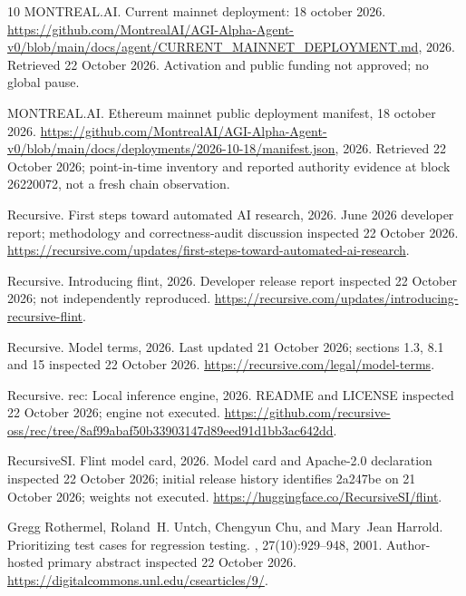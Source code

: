 \documentclass[11pt,letterpaper]{article}
\begin{document}
\begin{thebibliography}{10}
{MONTREAL.AI}.
\newblock Current mainnet deployment: 18 october 2026.
\newblock
  \url{https://github.com/MontrealAI/AGI-Alpha-Agent-v0/blob/main/docs/agent/CURRENT_MAINNET_DEPLOYMENT.md},
  2026.
\newblock Retrieved 22 October 2026. Activation and public funding not
  approved; no global pause.

{MONTREAL.AI}.
\newblock Ethereum mainnet public deployment manifest, 18 october 2026.
\newblock
  \url{https://github.com/MontrealAI/AGI-Alpha-Agent-v0/blob/main/docs/deployments/2026-10-18/manifest.json},
  2026.
\newblock Retrieved 22 October 2026; point-in-time inventory and reported
  authority evidence at block 26220072, not a fresh chain observation.

{Recursive}.
\newblock First steps toward automated {AI} research, 2026.
 June 2026 developer report; methodology and correctness-audit
  discussion inspected 22 October 2026.
  \url{https://recursive.com/updates/first-steps-toward-automated-ai-research}.

{Recursive}.
\newblock Introducing flint, 2026.
\newblock Developer release report inspected 22 October 2026; not independently
  reproduced. \url{https://recursive.com/updates/introducing-recursive-flint}.

{Recursive}.
\newblock Model terms, 2026.
\newblock Last updated 21 October 2026; sections 1.3, 8.1 and 15 inspected 22
  October 2026. \url{https://recursive.com/legal/model-terms}.

{Recursive}.
\newblock rec: Local inference engine, 2026.
\newblock README and LICENSE inspected 22 October 2026; engine not executed.
  \url{https://github.com/recursive-oss/rec/tree/8af99abaf50b33903147d89eed91d1bb3ac642dd}.

{RecursiveSI}.
\newblock Flint model card, 2026.
\newblock Model card and Apache-2.0 declaration inspected 22 October 2026;
  initial release history identifies 2a247be on 21 October 2026; weights not
  executed. \url{https://huggingface.co/RecursiveSI/flint}.

Gregg Rothermel, Roland~H. Untch, Chengyun Chu, and Mary~Jean Harrold.
\newblock Prioritizing test cases for regression testing.
, 27(10):929--948,
  2001.
\newblock Author-hosted primary abstract inspected 22 October 2026.
  \url{https://digitalcommons.unl.edu/csearticles/9/}.


\end{thebibliography}
\end{document}
